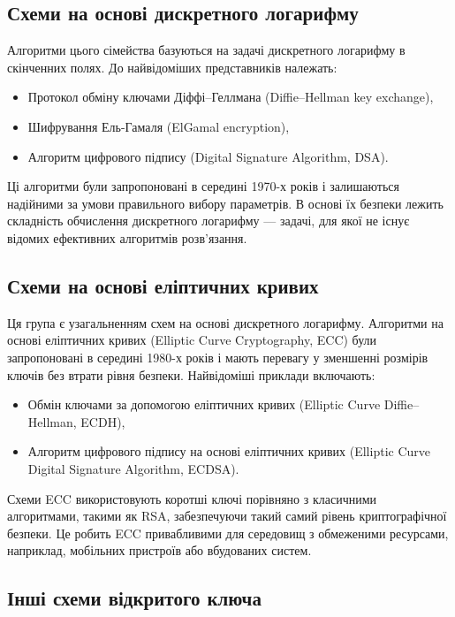 \documentclass[12pt]{report}
\begin{document}
\subsection{Схеми на основі дискретного логарифму}

Алгоритми цього сімейства базуються на задачі дискретного логарифму в скінченних полях. До найвідоміших представників належать:
\begin{itemize}
    \item Протокол обміну ключами Діффі–Геллмана (Diffie–Hellman key exchange),
    \item Шифрування Ель-Гамаля (ElGamal encryption),
    \item Алгоритм цифрового підпису (Digital Signature Algorithm, DSA).
\end{itemize}

Ці алгоритми були запропоновані в середині 1970-х років і залишаються надійними за умови правильного вибору параметрів. В основі їх безпеки лежить складність обчислення дискретного логарифму — задачі, для якої не існує відомих ефективних алгоритмів розв’язання.

\subsection{Схеми на основі еліптичних кривих}

Ця група є узагальненням схем на основі дискретного логарифму. Алгоритми на основі еліптичних кривих (Elliptic Curve Cryptography, ECC) були запропоновані в середині 1980-х років і мають перевагу у зменшенні розмірів ключів без втрати рівня безпеки. Найвідоміші приклади включають:
\begin{itemize}
    \item Обмін ключами за допомогою еліптичних кривих (Elliptic Curve Diffie–Hellman, ECDH),
    \item Алгоритм цифрового підпису на основі еліптичних кривих (Elliptic Curve Digital Signature Algorithm, ECDSA).
\end{itemize}

Схеми ECC використовують коротші ключі порівняно з класичними алгоритмами, такими як RSA, забезпечуючи такий самий рівень криптографічної безпеки. Це робить ECC привабливими для середовищ з обмеженими ресурсами, наприклад, мобільних пристроїв або вбудованих систем.

\subsection{Інші схеми відкритого ключа}
\end{document}
